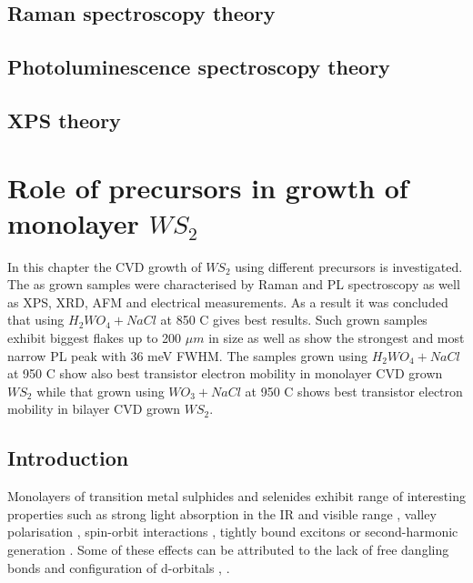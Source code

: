 \documentclass[12pt]{article}
\begin{document}
	\subsection{Raman spectroscopy theory}
	\subsection{Photoluminescence spectroscopy theory}
	\subsection{XPS theory}
	
\section{Role of precursors in growth of monolayer $WS_2$}

In this chapter the CVD growth of $WS_2$ using different precursors is investigated. The as grown samples were characterised by Raman and PL spectroscopy as well as XPS, XRD, AFM and electrical measurements. As a result it was concluded that using $H_2WO_4 + NaCl$ at 850 {\degree}C gives best results. Such grown samples exhibit biggest flakes up to 200 $\mu m$ in size as well as show the strongest and most narrow PL peak with 36 meV FWHM. The samples grown using $H_2WO_4 + NaCl$ at 950 {\degree}C show also best transistor electron mobility in monolayer CVD grown $WS_2$ while that grown using $WO_3 + NaCl$ at 950 {\degree}C shows best transistor electron mobility in bilayer CVD grown $WS_2$. 

	\subsection{Introduction}
	
Monolayers of transition metal sulphides and selenides exhibit range of interesting properties such as strong light absorption in the IR and visible range \cite{AtomicallyThinMoS2ANewDirect-GapSemiconductor}\cite{ExtraordinarySunlightAbsorptionAndOneNanometerThickPhotovoltaicsUsingTwo-DimensionalMonolayerMaterials}\cite{EvolutionOfElectronicStructureInAtomicallyThinSheetsOfWS2AndWSe2}, valley polarisation \cite{ControlOfValleyPolarizationInMonolayerMoS2ByOpticalHelicity} \cite{ValleyPolarizationInMoS2MonolayersByOpticalPumping}, spin-orbit interactions \cite{CoupledSpinAndValleyPhysicsInMonolayersOfMoS2AndOtherGroup-VIDichalcogenides}\cite{GiantSpin-orbit-inducedSpinSplittingInTwo-dimensionalTransition-metalDichalcogenideSemiconductors}, tightly bound excitons \cite{TightlyBoundTrionsInMonolayer} or second-harmonic generation \cite{ProbingSymmetryPropertiesOfFew-LayerMoS2Andh-BNByOpticalSecond-HarmonicGeneration}. Some of these effects can be attributed to the lack of free dangling bonds and configuration of d-orbitals \cite{TheTransitionMetalDichalcogenidesDiscussionAndInterpretationOfTheObservedOpticalElectricalAndStructuralProperties}, \cite{ElectronicPropertiesOfMoS2Nanoparticles}.
\end{document}
